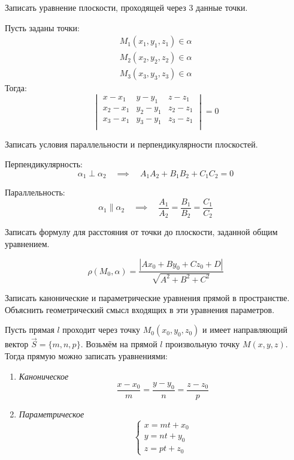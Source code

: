 \begin{question}
  Записать уравнение плоскости, проходящей через 3 данные точки.
\end{question}
\begin{answer}
  Пусть заданы точки:
  \begin{gather*}
    M_1(x_1, y_1, z_1) \in \alpha \\
    M_2(x_2, y_2, z_2) \in \alpha \\
    M_3(x_3, y_3, z_3) \in \alpha 
  \end{gather*}
  Тогда: \[
    \begin{vmatrix}
      x - x_1 & y - y_1 & z - z_1 \\
      x_2 - x_1 & y_2 - y_1 & z_2 - z_1 \\
      x_3 - x_1 & y_3 - y_1 & z_3 - z_1 \\
    \end{vmatrix} = 0
\]
\end{answer}

\begin{question}
  Записать условия параллельности и перпендикулярности плоскостей.
\end{question}
\begin{answer}
  Перпендикулярность: \[
    \alpha_1 \perp \alpha_2 \quad \implies \quad
    A_1 A_2 + B_1 B_2 + C_1 C_2 = 0
  \] 
  
  Параллельность: \[
    \alpha_1 \parallel \alpha_2 \quad \implies \quad
    \frac{A_1}{A_2} = \frac{B_1}{B_2} = \frac{C_1}{C_2}
  \]
\end{answer}


\begin{question}
  Записать формулу для расстояния от точки до плоскости, заданной общим уравнением.
\end{question}
\begin{answer}
  \[
    \rho(M_0, \alpha) = \frac{|Ax_0 + By_0 + Cz_0 + D| }{\sqrt{A^2 + B^2 + C^2}} 
  \] 
\end{answer}


\begin{question}
  Записать канонические и параметрические уравнения прямой в пространстве. Объяснить геометрический смысл входящих в эти уравнения параметров.
\end{question}
\begin{answer}
  Пусть прямая $l$ проходит через точку $M_0\left(x_0, y_0, z_0 \right)$ и имеет направляющий вектор $\vec{S} = \{m, n, p\}$.
Возьмём на прямой $l$ произвольную точку $M(x, y, z)$.
Тогда прямую можно записать уравнениями:
  \begin{enumerate}
    \item \textit{Каноническое} \\
    \[
      \frac{x - x_0}{m} = \frac{y - y_0}{n} = \frac{z - z_0}{p}
    \] 
    \item \textit{Параметрическое}
    \[
    \begin{cases}
      x = mt + x_0 \\
      y = nt + y_0 \\
      z = pt + z_0
    \end{cases}  
    \] 
  \end{enumerate}
\end{answer}

